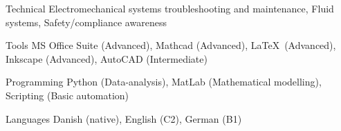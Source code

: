 

\begin{cvskills}

  \cvskill
    {Technical} %
    {Electromechanical systems troubleshooting and maintenance, Fluid systems, Safety/compliance awareness} %

  \cvskill
    {Tools} %
    {MS Office Suite (Advanced), Mathcad (Advanced), \LaTeX\ (Advanced), Inkscape (Advanced), AutoCAD (Intermediate)} %

  \cvskill
    {Programming} %
    {Python (Data-analysis), MatLab (Mathematical modelling), Scripting  (Basic automation)} %

  \cvskill
    {Languages} %
    {Danish (native), English (C2), German (B1)} %
  \vspace{2mm}
\end{cvskills}

